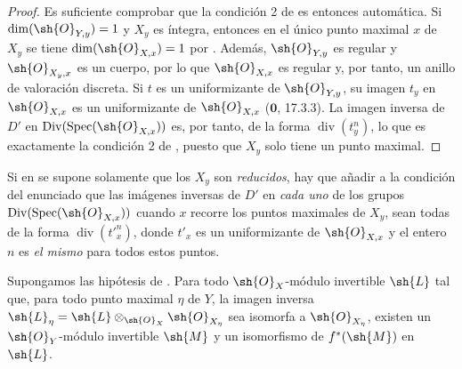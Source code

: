 \begin{proof}
Es suficiente comprobar que la condición 2\textdegree{} de {} es entonces
automática. Si $\dim(\sh{O}_{Y,y})=1$ y $X_y$ es íntegra, entonces en
el único punto maximal $x$ de $X_y$ se tiene
$\dim(\sh{O}_{X,x})=1$ por {}. Además,
$\sh{O}_{Y,y}$ es regular y $\sh{O}_{X_y,x}$ es un cuerpo, por lo que
$\sh{O}_{X,x}$ es regular {} y, por tanto, un anillo de valoración discreta.
Si $t$ es un uniformizante de $\sh{O}_{Y,y}$, su imagen $t_y$ en
$\sh{O}_{X,x}$ es un uniformizante de $\sh{O}_{X,x}$
($\mathbf{0}$, 17.3.3). La imagen inversa de $D'$ en
$\operatorname{Div}(\operatorname{Spec}(\sh{O}_{X,x}))$ es, por tanto,
de la forma $\operatorname{div}(t_y^n)$, lo que es exactamente la condición
2\textdegree{} de {}, puesto que $X_y$ solo tiene un punto maximal.
\end{proof}

\begin{remark}[21.4.12]
\ifdefined\EGAIVSuppressErratumLabels\else\label{IV.21.4.12}\fi
Si en {} se supone solamente que los $X_y$ son \emph{reducidos}, hay que
añadir a la condición del enunciado que las imágenes inversas de $D'$
en \emph{cada uno} de los grupos
$\operatorname{Div}(\operatorname{Spec}(\sh{O}_{X,x}))$ cuando $x$
recorre los puntos maximales de $X_y$, sean todas de la forma
$\operatorname{div}(t'^n_x)$, donde $t'_x$ es un uniformizante de
$\sh{O}_{X,x}$ y el entero $n$ es \emph{el mismo} para todos estos puntos.
\end{remark}

\begin{corollary}[21.4.13]
\ifdefined\EGAIVSuppressErratumLabels\else\label{IV.21.4.13}\fi
Supongamos las hipótesis de \textup{}. Para todo
$\sh{O}_X$-módulo invertible $\sh{L}$ tal que, para todo punto maximal $\eta$ de
$Y$, la imagen inversa
$\sh{L}_\eta=\sh{L}\otimes_{\sh{O}_X}\sh{O}_{X_\eta}$
sea isomorfa a $\sh{O}_{X_\eta}$, existen un
$\sh{O}_Y$-módulo invertible $\sh{M}$ y un isomorfismo
de $f^*(\sh{M})$ en $\sh{L}$.
\end{corollary}

